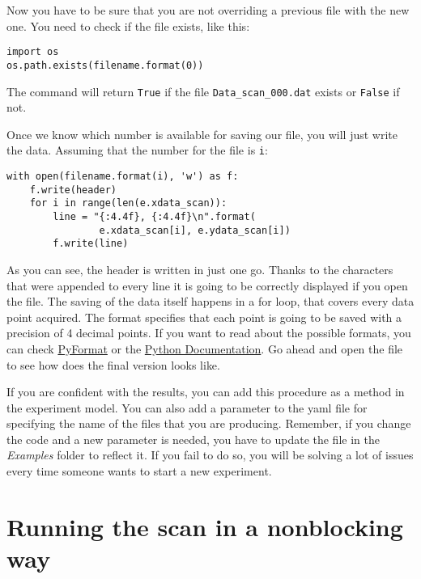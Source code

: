 Now you have to be sure that you are not overriding a previous file with
the new one. You need to check if the file exists, like this:

\begin{verbatim}
import os
os.path.exists(filename.format(0))
\end{verbatim}

The command will return \texttt{True} if the file
\texttt{Data_scan_000.dat} exists or \texttt{False} if not.


Once we know which number is available for saving our file, you will
just write the data. Assuming that the number for the file is
\texttt{i}:

\begin{verbatim}
with open(filename.format(i), 'w') as f:
    f.write(header)
    for i in range(len(e.xdata_scan)):
        line = "{:4.4f}, {:4.4f}\n".format(
                e.xdata_scan[i], e.ydata_scan[i])
        f.write(line)
\end{verbatim}

As you can see, the header is written in just one go. Thanks to the
\texttt{\n} characters that were appended to every line
it is going to be correctly displayed if you open the file. The saving
of the data itself happens in a for loop, that covers every data point
acquired. The format specifies that each point is going to be saved with
a precision of 4 decimal points. If you want to read about the possible
formats, you can check \href{https://pyformat.info/}{PyFormat} or the
\href{https://docs.python.org/3.6/library/stdtypes.html\#str.format}{Python
Documentation}. Go ahead and open the file to see how does the final
version looks like.

If you are confident with the results, you can add this procedure as a
method in the experiment model. You can also add a parameter to the
yaml file for specifying the name of the files that you are producing.
Remember, if you change the code and a new parameter is needed, you have
to update the file in the \emph{Examples} folder to reflect it. If you
fail to do so, you will be solving a lot of issues every time someone
wants to start a new experiment.

\section{Running the scan in a nonblocking way}\label{running-the-scan-in-a-nonblockingway}


